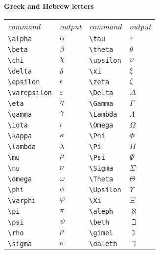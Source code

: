 \documentclass[10pt,landscape]{article}
\newcommand{\ColorSubsection}[1]{\par\vspace{1ex}\noindent\textcolor{subsectioncolor}{\normalsize\bfseries #1}\par\vspace{0.5ex}}
\begin{document}
\begin{multicols}{3}
\ColorSubsection{Greek and Hebrew letters}
\begin{tabular}{llll}
\emph{command} & \emph{output}&\emph{command} & \emph{output}\\
\verb!\alpha! & \(\alpha\)&\verb!\tau! & \(\tau\)\\
\verb!\beta! & \(\beta\)&\verb!\theta! & \(\theta\)\\
\verb!\chi! & \(\chi\)&\verb!\upsilon! & \(\upsilon\)\\
\verb!\delta! & \(\delta\)&\verb!\xi! & \(\xi\)\\
\verb!\epsilon! & \(\epsilon\)&\verb!\zeta! & \(\zeta\)\\
\verb!\varepsilon! & \(\varepsilon\)&\verb!\Delta! & \(\Delta\)\\
\verb!\eta! & \(\eta\)&\verb!\Gamma! & \(\Gamma\)\\
\verb!\gamma! & \(\gamma\)&\verb!\Lambda! & \(\Lambda\)\\
\verb!\iota! & \(\iota\)&\verb!\Omega! & \(\Omega\)\\
\verb!\kappa! & \(\kappa\)&\verb!\Phi! & \(\Phi\)\\
\verb!\lambda! & \(\lambda\)&\verb!\Pi! & \(\Pi\)\\
\verb!\mu! & \(\mu\)&\verb!\Psi! & \(\Psi\)\\
\verb!\nu! & \(\nu\)&\verb!\Sigma! & \(\Sigma\)\\
\verb!\omega! & \(\omega\)&\verb!\Theta! & \(\Theta\)\\
\verb!\phi! & \(\phi\)&\verb!\Upsilon! & \(\Upsilon\)\\
\verb!\varphi! & \(\varphi\)&\verb!\Xi! & \(\Xi\)\\
\verb!\pi! & \(\pi\)&\verb!\aleph! & \(\aleph\)\\
\verb!\psi! & \(\psi\)&\verb!\beth! & \(\beth\)\\
\verb!\rho! & \(\rho\)&\verb!\gimel! & \(\gimel\)\\
\verb!\sigma! & \(\sigma\)&\verb!\daleth! & \(\daleth\)
\end{tabular}



\end{multicols}
\end{document}
